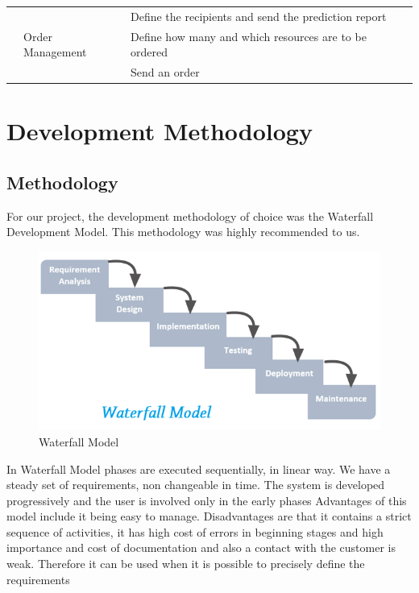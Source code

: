 \documentclass[a4paper,11pt,twoside]{report}
\theoremstyle{definition}
\begin{document}
\begin{longtable}{|p{3cm}|p{3cm}|p{10cm}|}
\texttt{} &  & Define the recipients and send the prediction report \\ \cline{2-3}

\texttt{} & Order Management & Define how many and which resources are to be ordered\\ \cline{3-3}
\texttt{} & & Send an order\\ \hline

\end{longtable}





\chapter{Development Methodology}


\section{Methodology}

For our project, the development methodology of choice was the Waterfall Development Model. This methodology was highly recommended to us.

\begin{figure}[h!]

\begin{center}

\includegraphics[width=\textwidth]{water}

\end{center}
\caption{Waterfall Model}
\end{figure}


In Waterfall Model phases are executed sequentially, in linear way. We have a steady set of requirements, non changeable in time. The system is developed progressively and the user is involved only in the early phases 
Advantages of this model include it being easy to manage. Disadvantages are that it contains a strict sequence of activities, it has high cost of errors in beginning stages and high importance and cost of documentation and also a contact with the customer is weak. Therefore it can be used when it is possible to precisely define the requirements 
\end{document}
